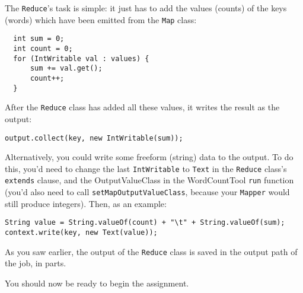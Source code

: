 \documentclass[a4paper,11pt]{article}
\begin{document}

The \texttt{Reduce}'s task is simple: it just has to add the values (counts) of the keys (words) which have been emitted from the \texttt{Map} class: 

\begin{lstlisting}
  int sum = 0;
  int count = 0;
  for (IntWritable val : values) {
	  sum += val.get();
	  count++;
  }
\end{lstlisting}

After the \texttt{Reduce} class has added all these values, it writes the result as the output:

\begin{lstlisting}
output.collect(key, new IntWritable(sum));
\end{lstlisting}

Alternatively, you could write some freeform (string) data to the output. To do this, you'd
need to change the last \texttt{IntWritable} to \texttt{Text} in the \texttt{Reduce} class's \texttt{extends} clause, and the OutputValueClass
in the WordCountTool \texttt{run} function (you'd also need to call \texttt{setMapOutputValueClass}, because your \texttt{Mapper} would still produce integers). Then,
as an example:
\begin{lstlisting}
String value = String.valueOf(count) + "\t" + String.valueOf(sum);
context.write(key, new Text(value));
\end{lstlisting}



As you saw earlier, the output of the \texttt{Reduce} class is saved in the output path of the job, in parts.

You should now be ready to begin the assignment.




\end{document}
